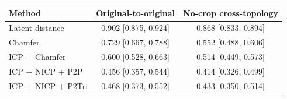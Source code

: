 \begin{tabular}{lcc}
\toprule
Method & Original-to-original & No-crop cross-topology \\
\midrule
Latent distance & 0.902 [0.875, 0.924] & 0.868 [0.833, 0.894] \\
Chamfer & 0.729 [0.667, 0.788] & 0.552 [0.488, 0.606] \\
ICP + Chamfer & 0.600 [0.528, 0.663] & 0.514 [0.449, 0.573] \\
ICP + NICP + P2P & 0.456 [0.357, 0.544] & 0.414 [0.326, 0.499] \\
ICP + NICP + P2Tri & 0.468 [0.373, 0.552] & 0.433 [0.350, 0.514] \\
\bottomrule
\end{tabular}
